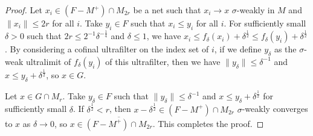 \documentclass[noamsfonts,a4paper,10pt]{amsart}
\theoremstyle{plain}
\theoremstyle{definition}
\theoremstyle{remark}
\begin{document}
\begin{proof}
Let $x_i\in (F-M^+)\cap M_{2r}$ be a net such that $x_i\to x$ $\sigma$-weakly in $M$ and $\|x_i\|\le2r$ for all $i$.
Take $y_i\in F$ such that $x_i\le y_i$ for all $i$.
For sufficiently small $\delta>0$ such that $2r\le2^{-1}\delta^{-\frac14}$ and $\delta\le1$, we have $x_i\le f_\delta(x_i)+\delta^{\frac12}\le f_\delta(y_i)+\delta^{\frac12}$.
By considering a cofinal ultrafilter on the index set of $i$, if we define $y_\delta$ as the $\sigma$-weak ultralimit of $f_\delta(y_i)$ of this ultrafilter, then we have $\|y_\delta\|\le\delta^{-1}$ and $x\le y_\delta+\delta^{\frac12}$, so $x\in G$.

Let $x\in G\cap M_r$.
Take $y_\delta\in F$ such that $\|y_\delta\|\le\delta^{-1}$ and $x\le y_\delta+\delta^{\frac12}$ for sufficiently small $\delta$.
If $\delta^{\frac12}<r$, then $x-\delta^{\frac12}\in(F-M^+)\cap M_{2r}$ $\sigma$-weakly converges to $x$ as $\delta\to0$, so $x\in\overline{(F-M^+)\cap M_{2r}}$.
This completes the proof.
\end{proof}
\end{document}
